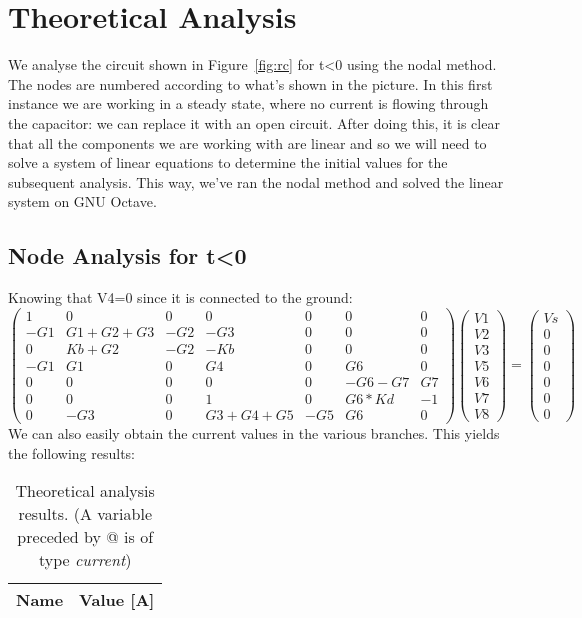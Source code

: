 \section{Theoretical Analysis}
\label{sec:analysis}

We analyse the circuit shown in Figure~\ref{fig:rc} for t<0 using the nodal method.
The nodes are numbered according to what's shown in the picture.
In this first instance we are working in a steady state, where no current is flowing through the capacitor: we can replace it with an open circuit.
After doing this, it is clear that all the components we are working with are linear and so we will need to solve a system of linear equations to determine the initial values for the subsequent analysis.
This way, we’ve ran the nodal method and solved the linear system on GNU Octave.
\subsection{Node Analysis for t<0}
Knowing that V4=0 since it is connected to the ground:
\begin{equation}
\begin{pmatrix}
1 & 0 & 0 & 0 & 0 & 0 & 0\\
-G1 & G1+G2+G3 & -G2 & -G3 & 0 & 0 & 0\\
0 & Kb+G2 & -G2 & -Kb & 0 & 0 & 0\\
-G1 & G1 & 0 & G4 & 0 & G6 & 0\\
0 & 0 & 0 & 0 & 0 & -G6-G7 & G7\\
0 & 0 & 0 & 1 & 0 & G6*Kd & -1\\
0 & -G3 & 0 & G3+G4+G5 & -G5 & G6 & 0
\end{pmatrix}
\begin{pmatrix}
V1\\
V2\\
V3\\
V5\\
V6\\
V7\\
V8
\end{pmatrix}
=
\begin{pmatrix}
Vs\\
0\\
0\\
0\\
0\\
0\\
0
\end{pmatrix}
\end{equation}
We can also easily obtain the current values in the various branches. This yields the following results:
\begin{table}[h]
  \centering
  \begin{tabular}{|l|r|}
    \hline    
    {\bf Name} & {\bf Value [A]} \\ \hline
     
  \end{tabular}
  \caption{Theoretical analysis results. (A variable preceded by @ is of type {\em current})}
  \label{tab:nodal}
\end{table}


